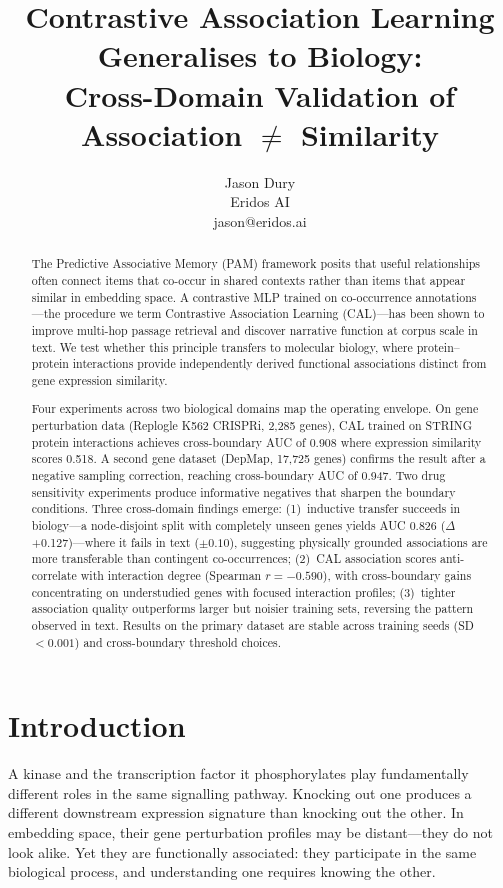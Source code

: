 \documentclass[11pt]{article}
\title{Contrastive Association Learning Generalises to Biology:\\Cross-Domain Validation of Association $\neq$ Similarity}
\author{Jason Dury\\Eridos AI\\jason@eridos.ai}
\date{}
\begin{document}
\maketitle

\begin{abstract}
\noindent The Predictive Associative Memory (PAM) framework posits that useful relationships often connect items that co-occur in shared contexts rather than items that appear similar in embedding space. A contrastive MLP trained on co-occurrence annotations---the procedure we term Contrastive Association Learning (CAL)---has been shown to improve multi-hop passage retrieval and discover narrative function at corpus scale in text. We test whether this principle transfers to molecular biology, where protein--protein interactions provide independently derived functional associations distinct from gene expression similarity.

Four experiments across two biological domains map the operating envelope. On gene perturbation data (Replogle K562 CRISPRi, 2,285 genes), CAL trained on STRING protein interactions achieves cross-boundary AUC of 0.908 where expression similarity scores 0.518. A second gene dataset (DepMap, 17,725 genes) confirms the result after a negative sampling correction, reaching cross-boundary AUC of 0.947. Two drug sensitivity experiments produce informative negatives that sharpen the boundary conditions. Three cross-domain findings emerge: (1)~inductive transfer succeeds in biology---a node-disjoint split with completely unseen genes yields AUC 0.826 ($\Delta$ +0.127)---where it fails in text ($\pm 0.10$), suggesting physically grounded associations are more transferable than contingent co-occurrences; (2)~CAL association scores anti-correlate with interaction degree (Spearman $r = -0.590$), with cross-boundary gains concentrating on understudied genes with focused interaction profiles; (3)~tighter association quality outperforms larger but noisier training sets, reversing the pattern observed in text. Results on the primary dataset are stable across training seeds (SD $< 0.001$) and cross-boundary threshold choices.
\end{abstract}

\section{Introduction}
\label{sec:introduction}

A kinase and the transcription factor it phosphorylates play fundamentally different roles in the same signalling pathway. Knocking out one produces a different downstream expression signature than knocking out the other. In embedding space, their gene perturbation profiles may be distant---they do not look alike. Yet they are functionally associated: they participate in the same biological process, and understanding one requires knowing the other.
\end{document}
